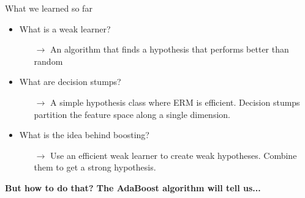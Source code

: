 \begin{frame}{What we learned so far}
    \begin{itemize}
        \item What is a weak learner? \pause
        \begin{itemize}
            \item[$\rightarrow$] An algorithm that finds a hypothesis that
                performs better than random
        \end{itemize} \pause
        \item What are decision stumps? \pause
        \begin{itemize}
            \item[$\rightarrow$] A simple hypothesis class where ERM is efficient.
                Decision stumps partition the feature space along a single dimension.
        \end{itemize} \pause
        \item What is the idea behind boosting? \pause
        \begin{itemize}
            \item[$\rightarrow$] Use an efficient weak learner to create weak hypotheses.
                Combine them to get a strong hypothesis.
        \end{itemize} \pause
    \end{itemize}
    \textbf{But how to do that? The AdaBoost algorithm will tell us...}
\end{frame}
